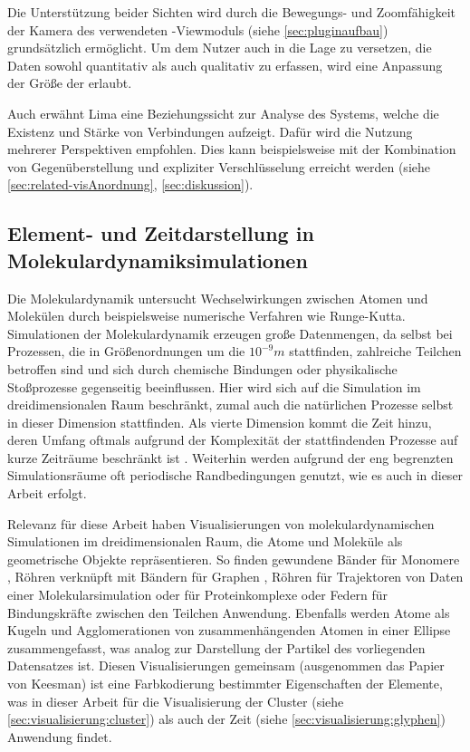 Die Unterstützung beider Sichten wird durch die Bewegungs- und Zoomfähigkeit der Kamera des verwendeten -Viewmoduls (siehe \autoref{sec:pluginaufbau}) grundsätzlich ermöglicht. Um dem Nutzer auch in die Lage zu versetzen, die Daten sowohl quantitativ als auch qualitativ zu erfassen, wird eine Anpassung der Größe der  erlaubt.

Auch erwähnt Lima eine Beziehungssicht zur Analyse des Systems, welche die Existenz und Stärke von Verbindungen aufzeigt. Dafür wird die Nutzung mehrerer Perspektiven empfohlen. Dies kann beispielsweise mit der Kombination von Gegenüberstellung und expliziter Verschlüsselung erreicht werden (siehe \autoref{sec:related-visAnordnung}, \autoref{sec:diskussion}). %

\subsection*{Element- und Zeitdarstellung in Molekulardynamiksimulationen}

Die Molekulardynamik untersucht Wechselwirkungen zwischen Atomen und Molekülen durch beispielsweise numerische Verfahren wie Runge-Kutta. Simulationen der Molekulardynamik erzeugen große Datenmengen, da selbst bei Prozessen, die in Größenordnungen um die $10^{-9}m$ stattfinden, zahlreiche Teilchen betroffen sind und sich durch chemische Bindungen oder physikalische Stoßprozesse gegenseitig beeinflussen. Hier wird sich auf die Simulation im dreidimensionalen Raum beschränkt, zumal auch die natürlichen Prozesse selbst in dieser Dimension stattfinden. Als vierte Dimension kommt die Zeit hinzu, deren Umfang oftmals aufgrund der Komplexität der stattfindenden Prozesse auf kurze Zeiträume beschränkt ist \cite{bylaska2013extendingTimeMD}. Weiterhin werden aufgrund der eng begrenzten Simulationsräume oft periodische Randbedingungen genutzt, wie es auch in dieser Arbeit erfolgt. %

Relevanz für diese Arbeit haben Visualisierungen von molekulardynamischen Simulationen im dreidimensionalen Raum, die Atome und Moleküle als geometrische Objekte repräsentieren. So finden gewundene Bänder für Monomere \cite{cohen2007proteins}, Röhren verknüpft mit Bändern für Graphen \cite{sathe2011graphene}, Röhren für Trajektoren von Daten einer Molekularsimulation \cite{grottel2014trajectories} oder für Proteinkomplexe \cite{small2013ribosomal} \cite{cao2013cancer} oder Federn für Bindungskräfte zwischen den Teilchen \cite{keesman2013springs} \cite{mcBride2013pathIntegral_web} Anwendung. Ebenfalls werden \cite{vis07grottel} Atome als Kugeln und Agglomerationen von zusammenhängenden Atomen in einer Ellipse zusammengefasst, was analog zur Darstellung der Partikel des vorliegenden Datensatzes ist. Diesen Visualisierungen gemeinsam (ausgenommen das Papier von Keesman) ist eine Farbkodierung bestimmter Eigenschaften der Elemente, was in dieser Arbeit für die Visualisierung der Cluster (siehe \autoref{sec:visualisierung:cluster}) als auch der Zeit (siehe \autoref{sec:visualisierung:glyphen}) Anwendung findet.


